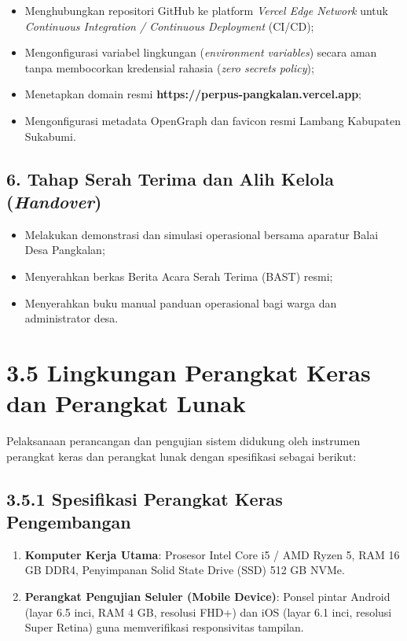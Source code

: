 \documentclass[
  indonesian,
  12pt,
]{report}
\providecommand{\tightlist}{%
  \setlength{\itemsep}{0pt}\setlength{\parskip}{0pt}}
\begin{document}
\begin{itemize}
\tightlist
\item
  Menghubungkan repositori GitHub ke platform \emph{Vercel Edge Network}
  untuk \emph{Continuous Integration / Continuous Deployment} (CI/CD);
\item
  Mengonfigurasi variabel lingkungan (\emph{environment variables})
  secara aman tanpa membocorkan kredensial rahasia (\emph{zero secrets
  policy});
\item
  Menetapkan domain resmi \textbf{https://perpus-pangkalan.vercel.app};
\item
  Mengonfigurasi metadata OpenGraph dan favicon resmi Lambang Kabupaten
  Sukabumi.
\end{itemize}

\subsection{\texorpdfstring{6. Tahap Serah Terima dan Alih Kelola
(\emph{Handover})}{6. Tahap Serah Terima dan Alih Kelola (Handover)}}\label{tahap-serah-terima-dan-alih-kelola-handover}

\begin{itemize}
\tightlist
\item
  Melakukan demonstrasi dan simulasi operasional bersama aparatur Balai
  Desa Pangkalan;
\item
  Menyerahkan berkas Berita Acara Serah Terima (BAST) resmi;
\item
  Menyerahkan buku manual panduan operasional bagi warga dan
  administrator desa.
\end{itemize}

\section{3.5 Lingkungan Perangkat Keras dan Perangkat
Lunak}\label{lingkungan-perangkat-keras-dan-perangkat-lunak}

Pelaksanaan perancangan dan pengujian sistem didukung oleh instrumen
perangkat keras dan perangkat lunak dengan spesifikasi sebagai berikut:

\subsection{3.5.1 Spesifikasi Perangkat Keras
Pengembangan}\label{spesifikasi-perangkat-keras-pengembangan}

\begin{enumerate}
\def\labelenumi{\arabic{enumi}.}
\tightlist
\item
  \textbf{Komputer Kerja Utama}: Prosesor Intel Core i5 / AMD Ryzen 5,
  RAM 16 GB DDR4, Penyimpanan Solid State Drive (SSD) 512 GB NVMe.
\item
  \textbf{Perangkat Pengujian Seluler (Mobile Device)}: Ponsel pintar
  Android (layar 6.5 inci, RAM 4 GB, resolusi FHD+) dan iOS (layar 6.1
  inci, resolusi Super Retina) guna memverifikasi responsivitas
  tampilan.
\end{enumerate}
\end{document}
